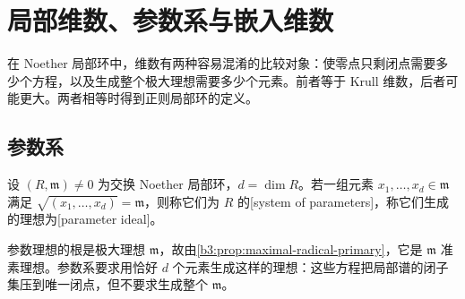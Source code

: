 
\section{局部维数、参数系与嵌入维数}
\label{b3:sec:0904}

在 Noether 局部环中，维数有两种容易混淆的比较对象：使零点只剩闭点需要多少个方程，以及生成整个极大理想需要多少个元素。前者等于 Krull 维数，后者可能更大。两者相等时得到正则局部环的定义。


\subsection{参数系}
\label{b3:subsec:0904:01}

\begin{definition}\label{b3:def:system-of-parameters}
	设 \((R,\mathfrak m)\ne0\) 为交换 Noether 局部环，\(d=\dim R\)。若一组元素 \(x_1,\ldots,x_d\in\mathfrak m\) 满足 \(\sqrt{(x_1,\ldots,x_d)}=\mathfrak m\)，则称它们为 \(R\) 的[system of parameters]，称它们生成的理想为[parameter ideal]。
\end{definition}

参数理想的根是极大理想 \(\mathfrak m\)，故由\cref{b3:prop:maximal-radical-primary}，它是 \(\mathfrak m\) 准素理想。参数系要求用恰好 \(d\) 个元素生成这样的理想：这些方程把局部谱的闭子集压到唯一闭点，但不要求生成整个 \(\mathfrak m\)。

